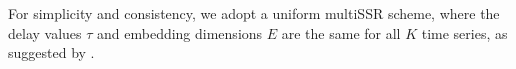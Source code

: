 

For simplicity and consistency, we adopt a uniform multiSSR scheme, where the delay values $\tau$ and embedding dimensions $E$ are the same for all $K$ time series, as suggested by \citep{vlachos2010nonuniform}.


